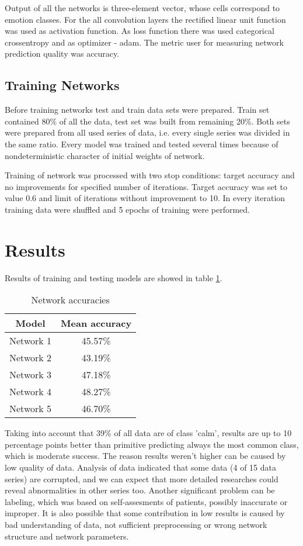 \documentclass[10pt,journal,compsoc]{IEEEtran}
\begin{document}
Output of all the networks is three-element vector, whose cells correspond to emotion classes. For the all convolution layers the rectified linear unit function was used as activation function. 
As loss function there was used categorical crossentropy and as optimizer - adam. The metric user for measuring network prediction quality was accuracy.

\subsection{Training Networks}
Before training networks test and train data sets were prepared. Train set contained 80\% of all the data, test set was built from remaining 20\%. Both sets were prepared from all used series of data, i.e. every single series was divided in the same ratio. Every model was trained and tested several times because of nondeterministic character of initial weights of network.

Training of network was processed with two stop conditions: target accuracy and no improvements for specified number of iterations. Target accuracy was set to value 0.6 and limit of iterations without improvement to 10. In every iteration training data were shuffled and 5 epochs of training were performed.


\section{Results}
Results of training and testing models are showed in table \ref{table_networks}.
\begin{table}[!t]
\renewcommand{\arraystretch}{1.3}
\caption{Network accuracies}
\label{table_networks}
\centering
\begin{tabular}{|c|c|}
\hline Model&Mean accuracy\\\hline
Network 1&45.57\%\\\hline
Network 2&43.19\%\\\hline
Network 3&47.18\%\\\hline
Network 4&48.27\%\\\hline
Network 5&46.70\%\\\hline
\end{tabular}
\end{table}

Taking into account that 39\% of all data are of class 'calm', results are up to 10 percentage points better than primitive predicting always the most common class, which is moderate success. The reason results weren't higher can be caused by low quality of data. Analysis of data indicated that some data (4 of 15 data series) are corrupted, and we can expect that more detailed researches could reveal abnormalities in other series too. Another significant problem can be labeling, which was based on self-assesments of patients, possibly inaccurate or improper. It is also possible that some contribution in low results is caused by bad understanding of data, not sufficient preprocessing or wrong network structure and network parameters.
\end{document}
